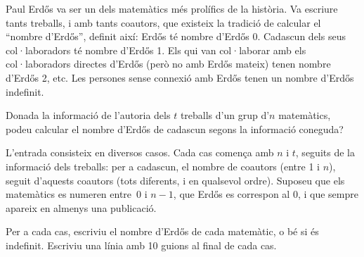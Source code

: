 

\Statement

Paul Erdős va ser un dels matemàtics més prolífics de la història.
Va escriure tants treballs, i amb tants coautors,
que existeix la tradició de calcular el ``nombre d'Erdős'',
definit així:
Erdős té nombre d'Erdős 0.
Cadascun dels seus col·laboradors té nombre d'Erdős 1.
Els qui van col·laborar amb els col·laboradors directes d'Erdős
(però no amb Erdős mateix) tenen nombre d'Erdős 2, etc.
Les persones sense connexió amb Erdős tenen un nombre d'Erdős indefinit.

\medskip

Donada la informació de l'autoria dels $t$ treballs d'un grup d'$n$ matemàtics,
podeu calcular el nombre d'Erdős de cadascun segons la informació coneguda?


\Input

L'entrada consisteix en diversos casos.
Cada cas comença amb $n$ i $t$,
seguits de la informació dels treballs:
per a cadascun, el nombre de coautors (entre 1 i $n$),
seguit d'aquests coautors (tots diferents, i en qualsevol ordre).
Suposeu que els matemàtics es numeren entre~0 i $n-1$,
que Erdős es correspon al 0,
i que sempre apareix en almenys una publicació.


\Output

Per a cada cas, escriviu el nombre d'Erdős de cada matemàtic,
o bé  si és indefinit.
Escriviu una línia amb 10 guions al final de cada cas.


\Sample

